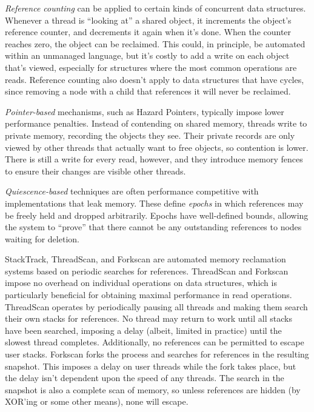 \textit{Reference counting} can be applied to certain kinds of concurrent data structures\cite{DMMS}\cite{GPST09}.  Whenever a thread is ``looking at'' a shared object, it increments the object's reference counter, and decrements it again when it's done.  When the counter reaches zero, the object can be reclaimed.  This could, in principle, be automated within an unmanaged language, but it's costly to add a write on each object that's viewed, especially for structures where the most common operations are reads.  Reference counting also doesn't apply to data structures that have cycles, since removing a node with a child that references it will never be reclaimed.

\textit{Pointer-based} mechanisms, such as Hazard Pointers\cite{HP}\cite{DTA}, typically impose lower performance penalties.  Instead of contending on shared memory, threads write to private memory, recording the objects they see.  Their private records are only viewed by other threads that actually want to free objects, so contention is lower.  There is still a write for every read, however, and they introduce memory fences to ensure their changes are visible other threads.

\textit{Quiescence-based} techniques\cite{FraserH07}\cite{Harris}\cite{Hart} are often performance competitive with implementations that leak memory.  These define \textit{epochs} in which references may be freely held and dropped arbitrarily.  Epochs have well-defined bounds, allowing the system to ``prove'' that there cannot be any outstanding references to nodes waiting for deletion.

StackTrack\cite{StackTrack}, ThreadScan\cite{Threadscan}, and Forkscan\cite{Forkscan} are automated memory reclamation systems based on periodic searches for references.  ThreadScan and Forkscan impose no overhead on individual operations on data structures, which is particularly beneficial for obtaining maximal performance in read operations.  ThreadScan operates by periodically pausing all threads and making them search their own stacks for references.  No thread may return to work until all stacks have been searched, imposing a delay (albeit, limited in practice) until the slowest thread completes.  Additionally, no references can be permitted to escape user stacks.  Forkscan forks the process and searches for references in the resulting snapshot.  This imposes a delay on user threads while the fork takes place, but the delay isn't dependent upon the speed of any threads.  The search in the snapshot is also a complete scan of memory, so unless references are hidden (by XOR'ing or some other means), none will escape.

